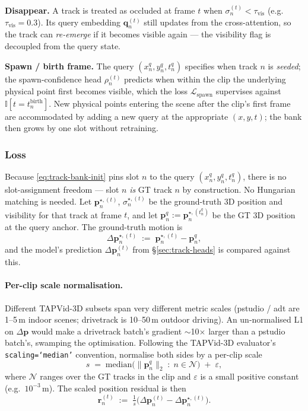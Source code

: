 \documentclass[11pt,a4paper]{article}
\begin{document}
\textbf{Disappear.} A track is treated as occluded at frame $t$ when
$\sigma_n^{(t)} < \tau_{\text{vis}}$ (e.g.\ $\tau_{\text{vis}}=0.3$).
Its query embedding $\bm{q}_n^{(t)}$ still updates from the
cross-attention, so the track can \emph{re-emerge} if it becomes
visible again — the visibility flag is decoupled from the query
state.

\textbf{Spawn / birth frame.} The query $(x_n^{q}, y_n^{q}, t_n^{q})$
specifies when track $n$ is \emph{seeded}; the spawn-confidence head
$\rho_n^{(t)}$ predicts when within the clip the underlying physical
point first becomes visible, which the loss
$\mathcal{L}_{\text{spawn}}$ supervises against
$\mathbb{I}[t = t_n^{\text{birth}}]$. New physical points entering the
scene after the clip's first frame are accommodated by adding a new
query at the appropriate $(x, y, t)$; the bank then grows by one slot
without retraining.

\subsubsection{Loss}
\label{sec:early-loss}

Because \eqref{eq:track-bank-init} pins slot $n$ to the query $(x_n^{q},
y_n^{q}, t_n^{q})$, there is no slot-assignment freedom — slot $n$
\emph{is} GT track $n$ by construction. No Hungarian matching is
needed. Let $\bm{p}_n^{\star,(t)}$, $\sigma_n^{\star,(t)}$ be the
ground-truth 3D position and visibility for that track at frame $t$,
and let $\bm{p}_n^{q} := \bm{p}_n^{\star,(t_n^{q})}$ be the GT 3D
position at the query anchor. The ground-truth motion is
\begin{equation}\label{eq:track-delta-star}
  \Delta\bm{p}_n^{\star,(t)} \;:=\; \bm{p}_n^{\star,(t)} - \bm{p}_n^{q},
\end{equation}
and the model's prediction $\Delta\bm{p}_n^{(t)}$ from
\S\ref{sec:track-heads} is compared against this.

\paragraph{Per-clip scale normalisation.}
Different TAPVid-3D subsets span very different metric scales
(pstudio / adt are 1--5\,m indoor scenes; drivetrack is 10--50\,m
outdoor driving). An un-normalised L1 on $\Delta\bm{p}$ would make a
drivetrack batch's gradient $\sim$10$\times$ larger than a pstudio
batch's, swamping the optimisation. Following the TAPVid-3D
evaluator's \texttt{scaling=`median'} convention, normalise both
sides by a per-clip scale
\begin{equation}\label{eq:track-scale}
  s \;=\; \mathrm{median}\!\bigl(\|\bm{p}_n^{q}\|_2 \;:\; n \in \mathcal{N}\bigr)
  \;+\; \varepsilon,
\end{equation}
where $\mathcal{N}$ ranges over the GT tracks in the clip and
$\varepsilon$ is a small positive constant (e.g.\ $10^{-3}$\,m). The
scaled position residual is then
\begin{equation}\label{eq:track-resid}
  \bm{r}_n^{(t)} \;:=\; \tfrac{1}{s}\bigl(\Delta\bm{p}_n^{(t)} - \Delta\bm{p}_n^{\star,(t)}\bigr).
\end{equation}
\end{document}
